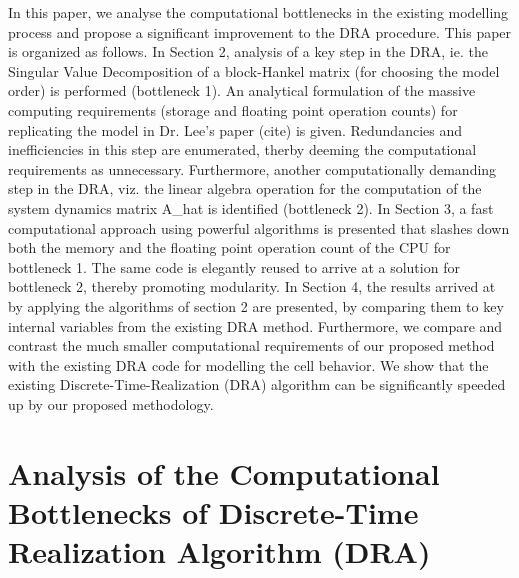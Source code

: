 In  this  paper,  we  analyse  the computational  bottlenecks  in  the  existing
modelling process  and propose a  significant improvement to the  DRA procedure.
This paper is organized as follows. In Section  2, analysis of a key step in the
DRA, ie. the Singular Value Decomposition of a block-Hankel matrix (for choosing
the model order)  is performed (bottleneck 1). An analytical  formulation of the
massive computing requirements (storage and floating point operation counts) for
replicating  the model  in Dr.  Lee's paper  (cite) is  given. Redundancies  and
inefficiencies in  this step  are enumerated,  therby deeming  the computational
requirements as unnecessary. Furthermore, another computationally demanding step
in the DRA, viz. the linear algebra  operation for the computation of the system
dynamics  matrix A\_hat  is  identified (bottleneck  2). In  Section  3, a  fast
computational approach using powerful algorithms  is presented that slashes down
both the memory and the floating point operation count of the CPU for bottleneck
1. The same code  is elegantly reused to arrive at a  solution for bottleneck 2,
thereby promoting modularity.  In Section 4, the results arrived  at by applying
the algorithms  of section 2  are presented, by  comparing them to  key internal
variables from the existing DRA method. Furthermore, we compare and contrast the
much  smaller  computational  requirements  of  our  proposed  method  with  the
existing DRA  code for modelling  the cell behavior.  We show that  the existing
Discrete-Time-Realization (DRA) algorithm can be significantly speeded up by our
proposed methodology.

\section{Analysis of the Computational  Bottlenecks of Discrete-Time Realization
Algorithm (DRA)}

